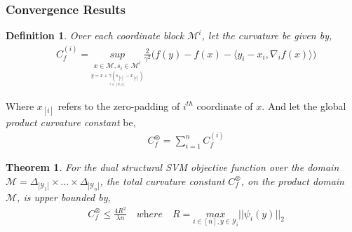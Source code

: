 \documentclass{article}
\newtheorem{theorem}{Theorem}
\newtheorem{definition}{Definition}
\begin{document}
\subsubsection{Convergence Results}
\begin{definition} \cite{Lacoste12}
Over each coordinate block $\mathcal{M}^{i}$, let the curvature be given by,
\begin{equation*}
\begin{aligned}
    &C^{(i)}_{f}= \underset{\underset{\underset{\gamma\in[0,1]}{y=x+\gamma(s_{[i]}-x_{[i]})}}{x\in\mathcal{M},s_{i}\in\mathcal{M}^{i}}}{sup}\frac{2}{\gamma^{2}}\Big(f(y)- f(x)- \langle y_{i}-x_{i}, \nabla_{i} f(x)\rangle\Big)
\end{aligned}
\end{equation*}
\end{definition}
Where $x_{[i]}$ refers to the zero-padding of $i^{th}$ coordinate of $x$. And let the global \emph{product curvature constant} be,
\begin{equation*}
\begin{aligned}
    &C^{\otimes}_{f}= \sum_{i=1}^{n}C^{(i)}_{f}
\end{aligned}
\end{equation*}
\begin{theorem} \cite{Lacoste12}
For the dual structural SVM objective function over the domain $\mathcal{M}= \Delta_{|\mathcal{Y}_{1}|}\times... \times\Delta_{|\mathcal{Y}_{n}|}$, the total curvature constant $C^{\otimes}_{f}$, on the product domain $\mathcal{M}$, is upper bounded by,
\begin{equation*}
\begin{aligned}
    &C^{\otimes}_{f} \leq \frac{4R^{2}}{\lambda n}
    \quad\textit{where} \quad R= \underset{i\in[n], y\in\mathcal{Y}_{i}}{max}||\psi_{i}(y)||_{2}
\end{aligned}
\end{equation*}
\end{theorem}
\end{document}
